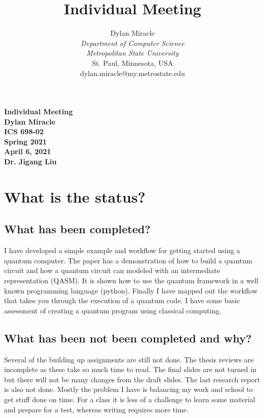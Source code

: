 \documentclass{article}
\begin{document}
\begin{titlepage}
    \begin{center}
        \vspace{4cm}
        \large
        \textbf{
            Individual Meeting \\
            Dylan Miracle \\
            ICS 698-02 \\
            Spring 2021 \\
            April 6, 2021 \\
            Dr. Jigang Liu
        }
    \end{center}
\end{titlepage}
\title{Individual Meeting}

\author{Dylan Miracle\\
\textit{Department of Computer Science} \\
\textit{Metropolitan State University}\\
St. Paul, Minnesota, USA \\
dylan.miracle@my.metrostate.edu
}

\maketitle

\tableofcontents

\section{What is the status?}
\subsection{What has been completed?}
I have developed a simple example and workflow for getting started using a quantum computer. The paper has a demonstration of how to build a quantum circuit and how a quantum circuit can modeled with an intermediate representation (QASM). It is shown how to use the quantum framework in a well known programming language (python). Finally I have mapped out the workflow that takes you through the execution of a quantum code. I have some basic assessment of creating a quantum program using classical computing.

\subsection{What has been not been completed and why?}
Several of the building up assignments are still not done. The thesis reviews are incomplete as these take so much time to read. The final slides are not turned in but there will not be many changes from the draft slides. The last research report is also not done. Mostly the problem I have is balancing my work and school to get stuff done on time. For a class it is less of a challenge to learn some material and prepare for a test, whereas writing requires more time.
\end{document}
